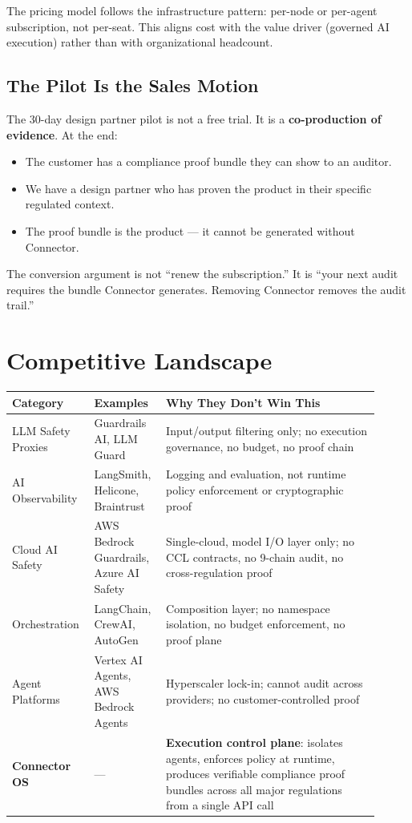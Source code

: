 \documentclass[11pt,a4paper]{article}
\begin{document}
The pricing model follows the infrastructure pattern: per-node or per-agent subscription,
not per-seat. This aligns cost with the value driver (governed AI execution) rather than
with organizational headcount.

\subsection{The Pilot Is the Sales Motion}

The 30-day design partner pilot is not a free trial. It is a \textbf{co-production of evidence}.
At the end:
\begin{itemize}
  \item The customer has a compliance proof bundle they can show to an auditor.
  \item We have a design partner who has proven the product in their specific regulated context.
  \item The proof bundle is the product — it cannot be generated without Connector.
\end{itemize}

The conversion argument is not ``renew the subscription.'' It is ``your next audit requires
the bundle Connector generates. Removing Connector removes the audit trail.''

\clearpage

\section{Competitive Landscape}
\label{sec:competition}

\begin{center}
\small
\begin{tabular}{@{}p{0.18\linewidth}p{0.18\linewidth}p{0.55\linewidth}@{}}
\toprule
\textbf{Category} & \textbf{Examples} & \textbf{Why They Don't Win This} \\
\midrule
LLM Safety Proxies & Guardrails AI, LLM Guard & Input/output filtering only; no execution governance, no budget, no proof chain \\
AI Observability & LangSmith, Helicone, Braintrust & Logging and evaluation, not runtime policy enforcement or cryptographic proof \\
Cloud AI Safety & AWS Bedrock Guardrails, Azure AI Safety & Single-cloud, model I/O layer only; no CCL contracts, no 9-chain audit, no cross-regulation proof \\
Orchestration & LangChain, CrewAI, AutoGen & Composition layer; no namespace isolation, no budget enforcement, no proof plane \\
Agent Platforms & Vertex AI Agents, AWS Bedrock Agents & Hyperscaler lock-in; cannot audit across providers; no customer-controlled proof \\
\midrule
\textbf{Connector OS} & — & \textbf{Execution control plane}: isolates agents, enforces policy at runtime, produces verifiable compliance proof bundles across all major regulations from a single API call \\
\bottomrule
\end{tabular}
\end{center}
\end{document}
